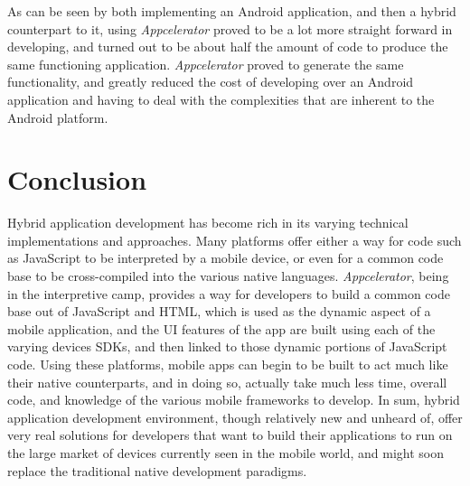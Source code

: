 \documentclass[11pt, twocolumn]{article}
\begin{document}
As can be seen by both implementing an Android application, and then a hybrid counterpart to it, using {\it Appcelerator} proved to be a lot more straight forward in developing, and turned out to be about half the amount of code to produce the same functioning application.  {\it Appcelerator} proved to generate the same functionality, and greatly reduced the cost of developing over an Android application and having to deal with the complexities that are inherent to the Android platform.

\section{Conclusion}
Hybrid application development has become rich in its varying technical implementations and approaches.  Many platforms offer either a way for code such as JavaScript to be interpreted by a mobile device, or even for a common code base to be cross-compiled into the various native languages. {\it Appcelerator}, being in the interpretive camp, provides a way for developers to build a common code base out of JavaScript and HTML, which is used as the dynamic aspect of a mobile application, and the UI features of the app are built using each of the varying devices SDKs, and then linked to those dynamic portions of JavaScript code.  Using these platforms, mobile apps can begin to be built to act much like their native counterparts, and in doing so, actually take much less time, overall code, and knowledge of the various mobile frameworks to develop.  In sum, hybrid application development environment, though relatively new and unheard of, offer very real solutions for developers that want to build their applications to run on the large market of devices currently seen in the mobile world, and might soon replace the traditional native development paradigms.



\end{document}
